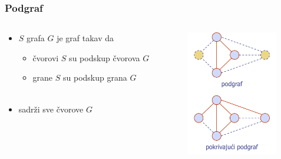 \documentclass[compress,aspectratio=169]{beamer}
\begin{document}
\begin{frame}[fragile]
  \frametitle{Podgraf}
  \begin{columns}
    \begin{column}[t]{6cm}
      \begin{itemize}
        \item {} $S$ grafa $G$ je graf takav da
        \begin{itemize}
          \item čvorovi $S$ su podskup čvorova $G$
          \item grane $S$ su podskup grana $G$ \\ \ \\
        \end{itemize}
        \item {} sadrži sve čvorove $G$
      \end{itemize}
    \end{column}
    \begin{column}[t]{6cm}
      \begin{center}
        \includegraphics[width=4cm]{asp-14-pic14.png}
      \end{center}
    \end{column}
  \end{columns}
\end{frame}
\end{document}
